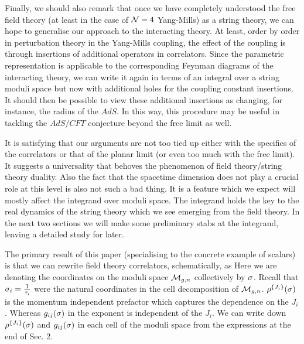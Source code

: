 Finally, we should also remark that once we have completely understood the free  
field theory (at least in the case of ${\cal N}=4$ Yang-Mills) as a string theory,
we can hope to generalise our approach to the interacting theory. At least, 
order by order in perturbation theory in the Yang-Mills coupling,  
the effect of the coupling is through insertions of additional operators in 
correlators. Since the parametric representation is 
applicable to the corresponding
Feynman diagrams of the interacting theory, we can write it again in terms of an 
integral over a string moduli space but now with additional holes for the coupling
constant insertions. 
It should then be possible to view these additional insertions
as changing, for instance, the radius of the $AdS$. 
In this way, this procedure may be useful in
tackling the $AdS/CFT$ conjecture beyond the free limit as well. 

It is satisfying that our arguments are not too tied up either
with the specifics of the correlators or that of the planar limit (or even too
much with the free limit).
It suggests a universality that behoves the phenomenon of field
theory/string theory duality. Also the fact that the spacetime
dimension does not play a crucial role at this level is also not such a
bad thing. It is a feature which we expect will mostly affect the
integrand over moduli space. The integrand holds the key to the
real dynamics of the string theory which we see emerging from the
field theory. In the next two sections we will make some preliminary
stabs at the integrand, leaving a detailed study for later.


 

The primary result of this paper (specialising to the concrete example 
of scalars) is that we can rewrite field theory correlators, schematically, as 
\eqn{}
Here we are denoting the coordinates on the moduli space ${\cal M}_{g,n}$
collectively by ${\sigma}$. Recall that ${\sigma}_i={1\over {\tau}_i}$ were the natural 
coordinates in the cell decomposition of ${\cal M}_{g,n}$. ${\rho}^{\{J_i\}}({\sigma})$
is the momentum independent prefactor which captures the dependence on the 
$J_i$. Whereas $g_{ij}({\sigma})$ in the exponent is independent of the $J_i$. We 
can write down ${\rho}^{\{J_i\}}({\sigma})$ and $g_{ij}({\sigma})$ in each 
cell of the moduli space from the expressions at the end of Sec. 2. 

